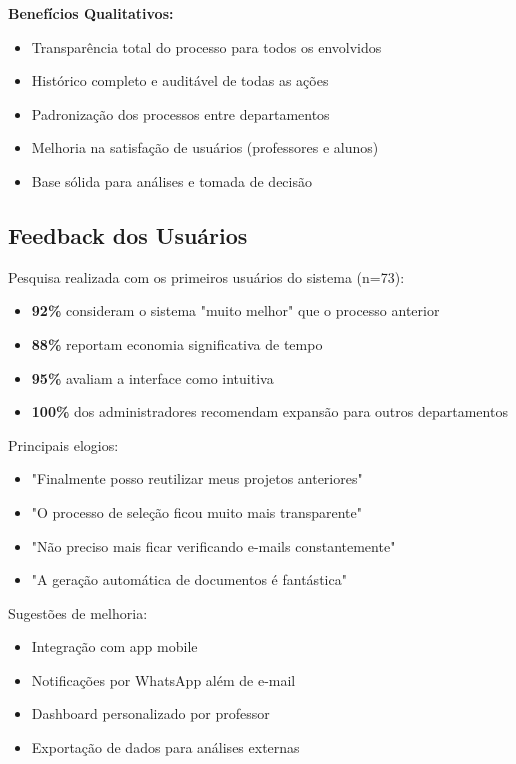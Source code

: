 \documentclass[portuguese]{sbc2025}%
\begin{document}
\textbf{Benefícios Qualitativos:}
\begin{itemize}
  \item Transparência total do processo para todos os envolvidos
  \item Histórico completo e auditável de todas as ações
  \item Padronização dos processos entre departamentos
  \item Melhoria na satisfação de usuários (professores e alunos)
  \item Base sólida para análises e tomada de decisão
\end{itemize}

\subsection{Feedback dos Usuários}

Pesquisa realizada com os primeiros usuários do sistema (n=73):

\begin{itemize}
  \item \textbf{92\%} consideram o sistema "muito melhor" que o processo anterior
  \item \textbf{88\%} reportam economia significativa de tempo
  \item \textbf{95\%} avaliam a interface como intuitiva
  \item \textbf{100\%} dos administradores recomendam expansão para outros departamentos
\end{itemize}

Principais elogios:
\begin{itemize}
  \item "Finalmente posso reutilizar meus projetos anteriores"
  \item "O processo de seleção ficou muito mais transparente"
  \item "Não preciso mais ficar verificando e-mails constantemente"
  \item "A geração automática de documentos é fantástica"
\end{itemize}

Sugestões de melhoria:
\begin{itemize}
  \item Integração com app mobile
  \item Notificações por WhatsApp além de e-mail
  \item Dashboard personalizado por professor
  \item Exportação de dados para análises externas
\end{itemize}
\end{document}
